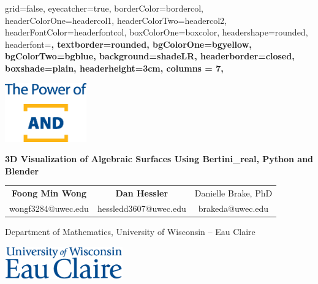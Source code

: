 \documentclass[paperwidth=46in, paperheight = 33.11in]{baposter}%
\begin{document}

\begin{poster}{
grid=false,
eyecatcher=true,
borderColor=bordercol,
headerColorOne=headercol1,
headerColorTwo=headercol2,
headerFontColor=headerfontcol,
boxColorOne=boxcolor, %
headershape=rounded, %
headerfont=\Large\sffamily\bfseries,%
textborder=rounded, %
bgColorOne=bgyellow,  %
bgColorTwo=bgblue, %
background=shadeLR,
headerborder=closed,
boxshade=plain,
headerheight=3cm,
columns = 7,
}
{
    \includegraphics[height=1.0in]{Power-of-AND_stckd_blu_CMYK.eps}

}
{\sffamily\bfseries \fontsize{22pt}{12pt}\selectfont \vspace{1.5mm}
3D Visualization of Algebraic Surfaces Using Bertini\_real, Python and Blender
}
{
\begin{minipage}{1\linewidth} \bf\sf
\centering
\footnotesize{
\begin{tabularx}{0.99\linewidth}{C  C  C} 
\Large{\sffamily\bfseries Foong Min Wong}			&	\Large{\sffamily\bfseries Dan Hessler}      & \large{Danielle Brake, PhD}\\
wongf3284@uwec.edu & hessledd3607@uwec.edu & brakeda@uwec.edu \\
\end{tabularx}}
\end{minipage}
\centering
\newline
\newline
\large{\sffamily Department of Mathematics, University of Wisconsin -- Eau Claire}
}
{
\includegraphics[width=2in]{UWEC-stacked-wordmark-Blue_cmyk.eps} 
}


\end{poster}
\end{document}
